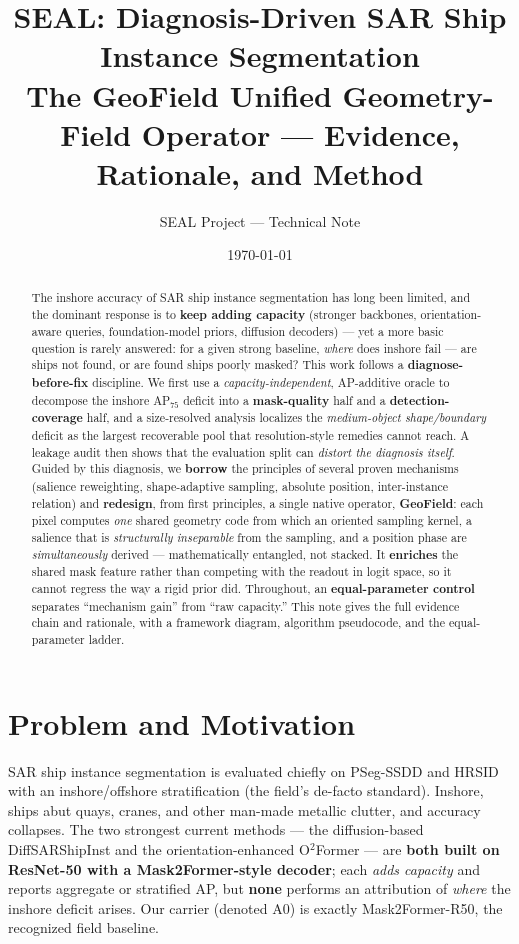 \documentclass[11pt,a4paper]{article}
\title{\textbf{SEAL: Diagnosis-Driven SAR Ship Instance Segmentation}\\[5pt]
\large The \textbf{GeoField} Unified Geometry-Field Operator --- Evidence, Rationale, and Method}
\author{SEAL Project --- Technical Note}
\date{\today}
\begin{document}
\maketitle

\begin{abstract}
\noindent
The inshore accuracy of SAR ship instance segmentation has long been limited, and the dominant
response is to \textbf{keep adding capacity} (stronger backbones, orientation-aware queries,
foundation-model priors, diffusion decoders) --- yet a more basic question is rarely answered: for a
given strong baseline, \emph{where} does inshore fail --- are ships not found, or are found ships
poorly masked? This work follows a \textbf{diagnose-before-fix} discipline. We first use a
\emph{capacity-independent}, AP-additive oracle to decompose the inshore AP$_{75}$ deficit into a
\textbf{mask-quality} half and a \textbf{detection-coverage} half, and a size-resolved analysis
localizes the \emph{medium-object shape/boundary} deficit as the largest recoverable pool that
resolution-style remedies cannot reach. A leakage audit then shows that the evaluation split can
\emph{distort the diagnosis itself}. Guided by this diagnosis, we \textbf{borrow} the principles of
several proven mechanisms (salience reweighting, shape-adaptive sampling, absolute position,
inter-instance relation) and \textbf{redesign}, from first principles, a single native operator,
\textbf{GeoField}: each pixel computes \emph{one} shared geometry code from which an oriented sampling
kernel, a salience that is \emph{structurally inseparable} from the sampling, and a position phase are
\emph{simultaneously} derived --- mathematically entangled, not stacked. It \textbf{enriches} the shared
mask feature rather than competing with the readout in logit space, so it cannot regress the way a rigid
prior did. Throughout, an \textbf{equal-parameter control} separates ``mechanism gain'' from ``raw
capacity.'' This note gives the full evidence chain and rationale, with a framework diagram, algorithm
pseudocode, and the equal-parameter ladder.
\end{abstract}

\section{Problem and Motivation}
SAR ship instance segmentation is evaluated chiefly on PSeg-SSDD and HRSID with an inshore/offshore
stratification (the field's de-facto standard). Inshore, ships abut quays, cranes, and other man-made
metallic clutter, and accuracy collapses. The two strongest current methods --- the diffusion-based
DiffSARShipInst and the orientation-enhanced O$^2$Former --- are \textbf{both built on ResNet-50 with a
Mask2Former-style decoder}; each \emph{adds capacity} and reports aggregate or stratified AP, but
\textbf{none} performs an attribution of \emph{where} the inshore deficit arises. Our carrier (denoted
A0) is exactly Mask2Former-R50, the recognized field baseline.
\end{document}
